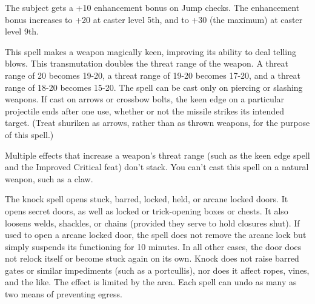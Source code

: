 \begin{multicols}{2}
\begin{small}
\noindent The subject gets a +10 enhancement bonus on Jump checks. The enhancement bonus increases to +20 at caster level 5th, and to +30 (the maximum) at caster level 9th.


\noindent This spell makes a weapon magically keen, improving its ability to deal telling blows. This transmutation doubles the threat range of the weapon. A threat range of 20 becomes 19-20, a threat range of 19-20 becomes 17-20, and a threat range of 18-20 becomes 15-20. The spell can be cast only on piercing or slashing weapons. If cast on arrows or crossbow bolts, the keen edge on a particular projectile ends after one use, whether or not the missile strikes its intended target. (Treat shuriken as arrows, rather than as thrown weapons, for the purpose of this spell.)

\smallskip\noindent Multiple effects that increase a weapon's threat range (such as the keen edge spell and the Improved Critical feat) don't stack. You can't cast this spell on a natural weapon, such as a claw.

\noindent The knock spell opens stuck, barred, locked, held, or arcane locked doors. It opens secret doors, as well as locked or trick-opening boxes or chests. It also loosens welds, shackles, or chains (provided they serve to hold closures shut). If used to open a arcane locked door, the spell does not remove the arcane lock but simply suspends its functioning for 10 minutes. In all other cases, the door does not relock itself or become stuck again on its own. Knock does not raise barred gates or similar impediments (such as a portcullis), nor does it affect ropes, vines, and the like. The effect is limited by the area. Each spell can undo as many as two means of preventing egress. 


\end{small}
\end{multicols}
